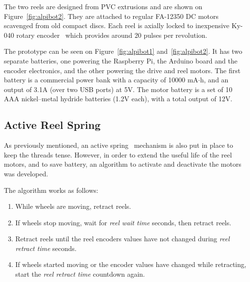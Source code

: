 \documentclass[journal]{IEEEtran}
\begin{document}

The two reels are designed from PVC extrusions and are shown on Figure~\ref{fig:alpibot2}.  They are attached to regular FA-12350 DC motors scavenged from old compact discs.  Each reel is axially locked to inexpensive Ky-040 rotary encoder~\cite{SugaharaJunOnoKoji1998} which provides around 20 pulses per revolution.

The prototype can be seen on Figure~\ref{fig:alpibot1} and~\ref{fig:alpibot2}.  It has two separate batteries, one powering the Raspberry Pi, the Arduino board and the encoder electronics, and the other powering the drive and reel motors. The first battery is a commercial power bank with a capacity of 10000 mA$\cdot$h, and an output of 3.1A (over two USB ports) at 5V. The motor battery is a set of 10 AAA nickel–metal hydride batteries (1.2V each), with a total output of 12V.  

\subsection{Active Reel Spring}

As previously mentioned, an active spring~\cite{Vanderborght2013} mechanism is also put in place to keep the threads tense.  However, in order to extend the useful life of the reel motors, and to save battery, an algorithm to  activate and deactivate the motors was developed. 

The algorithm works as follows: 

\begin{enumerate}
    \item While wheels are moving, retract reels.
    \item If wheels stop moving, wait for \textit{reel wait time} seconds, then retract reels. 
    \item Retract reels until the reel encoders values have not changed during \textit{reel retract time} seconds.
    \item If wheels started moving or the encoder values have changed while retracting, start the \textit{reel retract time} countdown again.
\end{enumerate}{}
\end{document}
